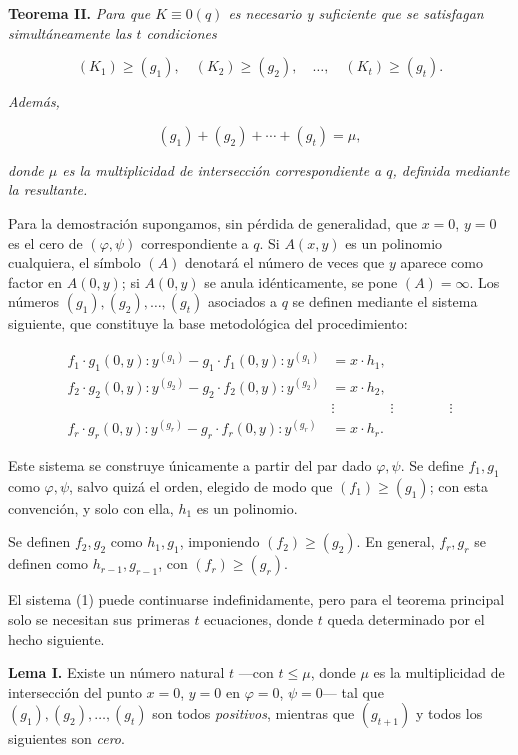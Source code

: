 \textbf{Teorema II.} \emph{Para que $K\equiv0(q)$ es necesario y suficiente que se satisfagan simultáneamente las $t$ condiciones}

\[
(K_1)\geq(g_1),\quad(K_2)\geq(g_2),\quad\ldots,\quad(K_t)\geq(g_t).
\]

\emph{Además,}

\[
(g_1)+(g_2)+\cdots+(g_t)=\mu,
\]

\emph{donde $\mu$ es la multiplicidad de intersección correspondiente a $q$, definida mediante la resultante.}

Para la demostración supongamos, sin pérdida de generalidad, que $x=0$, $y=0$ es el cero de $(\varphi,\psi)$ correspondiente a $q$. Si $A(x,y)$ es un polinomio cualquiera, el símbolo $(A)$ denotará el número de veces que $y$ aparece como factor en $A(0,y)$; si $A(0,y)$ se anula idénticamente, se pone $(A)=\infty$. Los números $(g_1),(g_2),\ldots,(g_t)$ asociados a $q$ se definen mediante el sistema siguiente, que constituye la base metodológica del procedimiento:

\begin{equation}
\tag{1}
\begin{aligned}
f_1\cdot g_1(0,y):y^{(g_1)} - g_1\cdot f_1(0,y):y^{(g_1)} &= x\cdot h_1,\\
f_2\cdot g_2(0,y):y^{(g_2)} - g_2\cdot f_2(0,y):y^{(g_2)} &= x\cdot h_2,\\
&\vdots \qquad\qquad\vdots\qquad\qquad\vdots\\
f_r\cdot g_r(0,y):y^{(g_r)} - g_r\cdot f_r(0,y):y^{(g_r)} &= x\cdot h_r.
\end{aligned}
\end{equation}

Este sistema se construye únicamente a partir del par dado $\varphi,\psi$. Se define $f_1,g_1$ como $\varphi,\psi$, salvo quizá el orden, elegido de modo que $(f_1)\geq(g_1)$; con esta convención, y solo con ella, $h_1$ es un polinomio.

Se definen $f_2,g_2$ como $h_1,g_1$, imponiendo $(f_2)\geq(g_2)$. En general, $f_r,g_r$ se definen como $h_{r-1},g_{r-1}$, con $(f_r)\geq(g_r)$.

El sistema (1) puede continuarse indefinidamente, pero para el teorema principal solo se necesitan sus primeras $t$ ecuaciones, donde $t$ queda determinado por el hecho siguiente.

\textbf{Lema I.} Existe un número natural $t$ ---con $t\leq\mu$, donde $\mu$ es la multiplicidad de intersección del punto $x=0$, $y=0$ en $\varphi=0$, $\psi=0$--- tal que $(g_1),(g_2),\ldots,(g_t)$ son todos \emph{positivos}, mientras que $(g_{t+1})$ y todos los siguientes son \emph{cero}.

